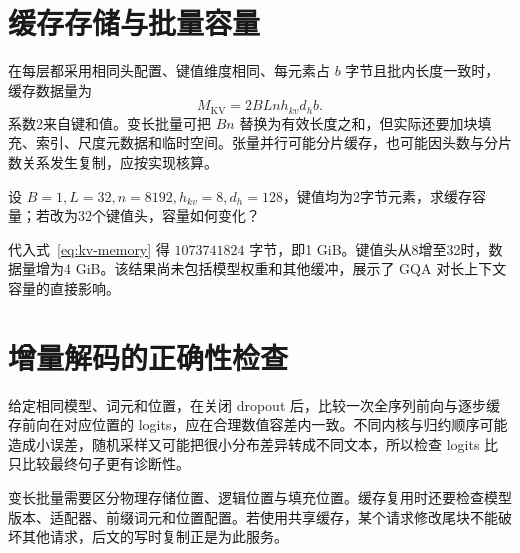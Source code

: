 \section{缓存存储与批量容量}

在每层都采用相同头配置、键值维度相同、每元素占 $b$ 字节且批内长度一致时，缓存数据量为
\begin{equation}
M_{\mathrm{KV}}=2BLnh_{kv}d_hb.
\label{eq:kv-memory}
\end{equation}
系数2来自键和值。变长批量可把 $Bn$ 替换为有效长度之和，但实际还要加块填充、索引、尺度元数据和临时空间。张量并行可能分片缓存，也可能因头数与分片数关系发生复制，应按实现核算。

\begin{example}
设 $B=1,L=32,n=8192,h_{kv}=8,d_h=128$，键值均为2字节元素，求缓存容量；若改为32个键值头，容量如何变化？
\end{example}
\begin{solve}
代入式~\eqref{eq:kv-memory} 得 $1073741824$ 字节，即1 GiB。键值头从8增至32时，数据量增为4 GiB。该结果尚未包括模型权重和其他缓冲，展示了 GQA 对长上下文容量的直接影响。
\end{solve}

\section{增量解码的正确性检查}

给定相同模型、词元和位置，在关闭 dropout 后，比较一次全序列前向与逐步缓存前向在对应位置的 logits，应在合理数值容差内一致。不同内核与归约顺序可能造成小误差，随机采样又可能把很小分布差异转成不同文本，所以检查 logits 比只比较最终句子更有诊断性。

变长批量需要区分物理存储位置、逻辑位置与填充位置。缓存复用时还要检查模型版本、适配器、前缀词元和位置配置。若使用共享缓存，某个请求修改尾块不能破坏其他请求，后文的写时复制正是为此服务。

